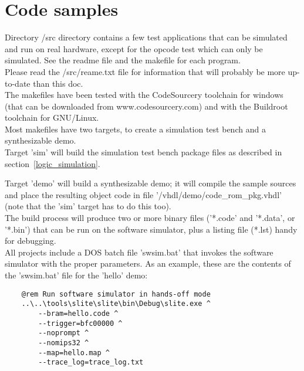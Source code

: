 \chapter{Code samples}
\label{samples}

    Directory /src directory contains a few test applications that can be 
    simulated and run on real hardware, except for the opcode test which can 
    only be simulated. See the readme file and the makefile for each program.\\

    Please read the /src/reame.txt file for information that will probably be
    more up-to-date than this doc.\\
    
    The makefiles have been tested with the CodeSourcery toolchain for windows 
    (that can be downloaded from www.codesourcery.com) and with the Buildroot 
    toolchain for GNU/Linux.\\

    Most makefiles have two targets, to create a simulation test bench and a
    synthesizable demo.\\

    Target 'sim' will build the simulation test bench package files as described 
    in section~\ref{logic_simulation}.
    
    Target 'demo' will build a synthesizable demo; it will compile the sample
    sources and place the resulting object code in file 
    '/vhdl/demo/code\_rom\_pkg.vhdl' (note that the 'sim' target has to do this 
    too).\\
    
    The build process will produce two or more binary files ('*.code' and 
    '*.data', or '*.bin') that can be run on the software simulator, plus a 
    listing file (*.lst) handy for debugging.\\
    
    All projects include a DOS batch file 'swsim.bat' that invokes the 
    software simulator with the proper parameters. As an example, these are the 
    contents of the 'swsim.bat' file for the 'hello' demo:
    
    \begin{verbatim}
    @rem Run software simulator in hands-off mode
    ..\..\tools\slite\slite\bin\Debug\slite.exe ^
        --bram=hello.code ^
        --trigger=bfc00000 ^
        --noprompt ^
        --nomips32 ^
        --map=hello.map ^
        --trace_log=trace_log.txt
    \end{verbatim}\\

